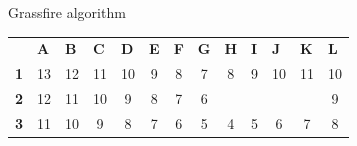 \documentclass[compress,xcolor=table]{beamer}
\begin{document}
\begin{frame}{Grassfire algorithm}
\begin{center}
{            \begin{tabular}{rcccccccccccc}
                \textbf{}                        & \multicolumn{1}{l}{\textbf{A}} & \multicolumn{1}{l}{\textbf{B}}                 & \multicolumn{1}{l}{\textbf{C}}                 & \multicolumn{1}{l}{\textbf{D}}                 & \multicolumn{1}{l}{\textbf{E}}                 & \multicolumn{1}{l}{\textbf{F}}                 & \multicolumn{1}{l}{\textbf{G}}                 & \multicolumn{1}{l}{\textbf{H}}                 & \multicolumn{1}{l}{\textbf{I}}                & \multicolumn{1}{l}{\textbf{J}}                & \multicolumn{1}{l}{\textbf{K}}                & \multicolumn{1}{l}{\textbf{L}} \\ \cline{2-13} 
                \multicolumn{1}{r|}{\textbf{1}}  & \multicolumn{1}{c|}{13}        & \multicolumn{1}{c|}{12}                        & \multicolumn{1}{c|}{11}                        & \multicolumn{1}{c|}{10}                        & \multicolumn{1}{c|}{9}                         & \multicolumn{1}{c|}{8}                         & \multicolumn{1}{c|}{7}                         & \multicolumn{1}{c|}{8}                         & \multicolumn{1}{c|}{9}                        & \multicolumn{1}{c|}{10}                       & \multicolumn{1}{c|}{11}                       & \multicolumn{1}{c|}{10}        \\ \cline{2-13} 
                \multicolumn{1}{r|}{\textbf{2}}  & \multicolumn{1}{c|}{12}        & \multicolumn{1}{c|}{11}                        & \multicolumn{1}{c|}{10}                        & \multicolumn{1}{c|}{9}                         & \multicolumn{1}{c|}{8}                         & \multicolumn{1}{c|}{7}                         & \multicolumn{1}{c|}{6}                         & \multicolumn{1}{c|}{\cellcolor[HTML]{000000}}  & \multicolumn{1}{c|}{\cellcolor[HTML]{000000}} & \multicolumn{1}{c|}{\cellcolor[HTML]{000000}} & \multicolumn{1}{c|}{\cellcolor[HTML]{000000}} & \multicolumn{1}{c|}{9}         \\ \cline{2-13} 
                \multicolumn{1}{r|}{\textbf{3}}  & \multicolumn{1}{c|}{11}        & \multicolumn{1}{c|}{10}                        & \multicolumn{1}{c|}{9}                         & \multicolumn{1}{c|}{8}                         & \multicolumn{1}{c|}{7}                         & \multicolumn{1}{c|}{6}                         & \multicolumn{1}{c|}{5}                         & \multicolumn{1}{c|}{4}                         & \multicolumn{1}{c|}{5}                        & \multicolumn{1}{c|}{6}                        & \multicolumn{1}{c|}{7}                        & \multicolumn{1}{c|}{8}         \\ \cline{2-13} 

\end{tabular}}
\end{center}
\end{frame}
\end{document}
